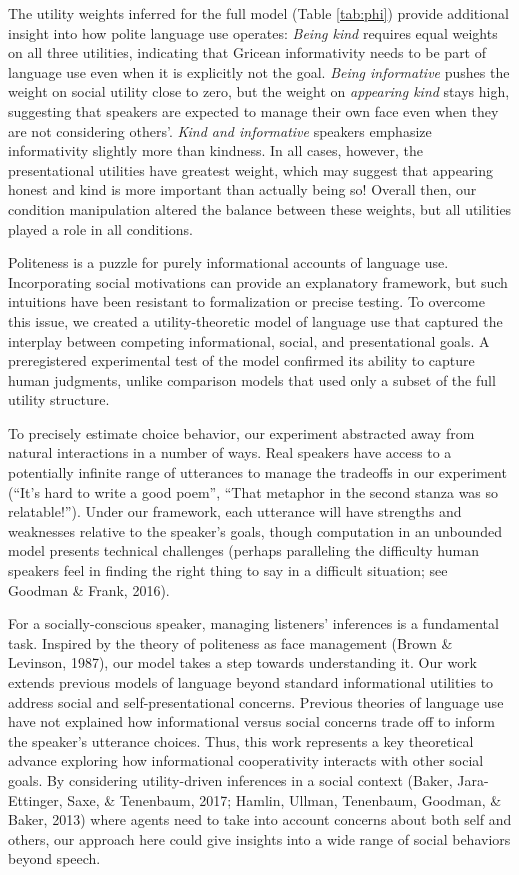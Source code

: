 \documentclass[floatsintext,mask,man]{apa6}
\theoremstyle{definition}
\theoremstyle{definition}
\theoremstyle{definition}
\theoremstyle{remark}
\begin{document}
The utility weights inferred for the full model (Table \ref{tab:phi})
provide additional insight into how polite language use operates:
\emph{Being kind} requires equal weights on all three utilities,
indicating that Gricean informativity needs to be part of language use
even when it is explicitly not the goal. \emph{Being informative} pushes
the weight on social utility close to zero, but the weight on
\emph{appearing kind} stays high, suggesting that speakers are expected
to manage their own face even when they are not considering others'.
\emph{Kind and informative} speakers emphasize informativity slightly
more than kindness. In all cases, however, the presentational utilities
have greatest weight, which may suggest that appearing honest and kind
is more important than actually being so! Overall then, our condition
manipulation altered the balance between these weights, but all
utilities played a role in all conditions.

Politeness is a puzzle for purely informational accounts of language
use. Incorporating social motivations can provide an explanatory
framework, but such intuitions have been resistant to formalization or
precise testing. To overcome this issue, we created a utility-theoretic
model of language use that captured the interplay between competing
informational, social, and presentational goals. A preregistered
experimental test of the model confirmed its ability to capture human
judgments, unlike comparison models that used only a subset of the full
utility structure.

To precisely estimate choice behavior, our experiment abstracted away
from natural interactions in a number of ways. Real speakers have access
to a potentially infinite range of utterances to manage the tradeoffs in
our experiment (\enquote{It's hard to write a good poem}, \enquote{That
metaphor in the second stanza was so relatable!}). Under our framework,
each utterance will have strengths and weaknesses relative to the
speaker's goals, though computation in an unbounded model presents
technical challenges (perhaps paralleling the difficulty human speakers
feel in finding the right thing to say in a difficult situation; see
Goodman \& Frank, 2016).

For a socially-conscious speaker, managing listeners' inferences is a
fundamental task. Inspired by the theory of politeness as face
management (Brown \& Levinson, 1987), our model takes a step towards
understanding it. Our work extends previous models of language beyond
standard informational utilities to address social and
self-presentational concerns. Previous theories of language use have not
explained how informational versus social concerns trade off to inform
the speaker's utterance choices. Thus, this work represents a key
theoretical advance exploring how informational cooperativity interacts
with other social goals. By considering utility-driven inferences in a
social context (Baker, Jara-Ettinger, Saxe, \& Tenenbaum, 2017; Hamlin,
Ullman, Tenenbaum, Goodman, \& Baker, 2013) where agents need to take
into account concerns about both self and others, our approach here
could give insights into a wide range of social behaviors beyond speech.
\end{document}
